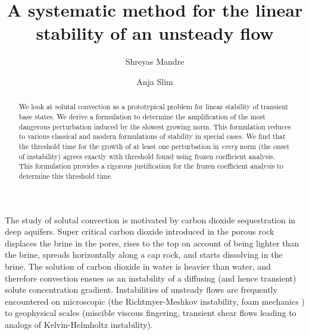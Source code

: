 \documentclass[letterpaper,10pt,prl,twocolumn,aps,reprint,superscriptaddress]{revtex4-1}
\begin{document}
\title{A systematic method for the linear stability of an unsteady flow}
\author{Shreyas Mandre}
\author{Anja Slim}
\begin{abstract}
We look at solutal convection as a prototypical problem for linear stability of transient base states. 
We derive a formulation to determine the amplification of the most dangerous perturbation induced by the slowest growing norm. 
This formulation reduces to various classical and modern formulations of stability in special cases. 
We find that the threshold time for the growth of at least one perturbation in {\em every} norm (the onset of instability) agrees exactly with threshold found using frozen coefficient analysis. 
This formulation provides a rigorous justification for the frozen coefficient analysis to determine this threshold time.
\end{abstract}
\maketitle
\listoftodos
\vspace{1cm}

The study of solutal convection is motivated by carbon dioxide sequestration in deep aquifers\cite{SlimRama10,RapakaChen08,RiazHesse06,EnnisKingPreston05,EnnisKingPaterson05}. 
Super critical carbon dioxide introduced in the porous rock displaces the brine in the pores, rises to the top on account of being lighter than the brine, spreads horizontally along a cap rock, and starts dissolving in the brine. 
The solution of carbon dioxide in water is heavier than water, and therefore convection ensues as an instability of a diffusing (and hence transient) solute concentration gradient. 
Instabilities of unsteady flows are frequently encountered on microscopic (the Richtmyer-Meshkov instability\cite{brouillette2002richtmyer}, foam mechanics \cite{anderson2010foam}) to geophysical scales (miscible viscous fingering\cite{homsy1987viscous}, transient shear flows leading to analogs of Kelvin-Helmholtz instability\cite{thorpe1968method}). 
\end{document}
